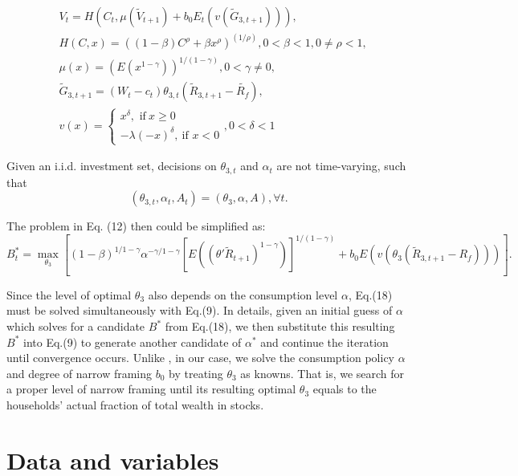\documentclass[ukenglish,nottitlepage,thmsb,11pt,letterpaper]{article}
\begin{document}
\begin{align*}
& V_t = H(C_t, \mu (\widetilde{V}_{t+1}) + b_0 E_t (v(\widetilde{G}_{3,t+1}  ) )), \\
& H(C,x) = \left( (1-\beta)C^\rho + \beta x^\rho \right)^ {(1/\rho)}, 0<\beta<1, 0\neq\rho<1,\\
& \mu(x) = (E (x^{1-\gamma}) )^{1/(1-\gamma)}, 0<\gamma \neq 0,\\
& \widetilde{G}_{3,t+1} = (W_t - c_t) \theta_{3,t} \left( \widetilde{R}_{3,t+1}-\widetilde{R_f} \right),\\
& v(x)=\left\{
\begin{array}{c}
x^\delta,\text{ if}\ x\geq 0 \\
-\lambda (-x)^\delta ,\ \text{if }%
x<0%
\end{array}%
\right., 0<\delta<1 
\end{align*}

Given an i.i.d. investment set, decisions on $\theta _{3,t}$ and $\alpha_t$ are not time-varying, such that
\begin{equation*}
(\theta_{3,t}, \alpha_t, A_t) = (\theta_3, \alpha, A), \forall t.
\end{equation*}

The problem in Eq. (12) then could be simplified as:
\begin{equation}
B^*_{t} = \underset {\theta_3}{\max} \left[ (1-\beta)^{1/1-\gamma} \alpha^{-\gamma/ 1-\gamma} [E((\theta' \widetilde{R}_{t+1})^{1-\gamma})]^{1/(1-\gamma)}  +  b_0 E ( v(\theta_{3} (\widetilde{R}_{3,t+1} - R_f) )) \right].
\end{equation}

Since the level of optimal $\theta_3$ also depends on the consumption level $\alpha$, Eq.(18) must be solved simultaneously with Eq.(9). In details, given an initial guess of $\alpha$ which solves for a candidate $B^*$ from Eq.(18), we then substitute this resulting $B^*$ into Eq.(9) to generate another candidate of $\alpha^*$ and continue the iteration until convergence occurs. Unlike \citet{Barberis2009}, in our case, we solve the consumption policy $\alpha$ and degree of narrow framing $b_0$ by treating $\theta_3$ as knowns. That is, we search for a proper level of narrow framing until its resulting optimal $\theta_3$ equals to the households' actual fraction of total wealth in stocks.

\section{Data and variables}
\end{document}
